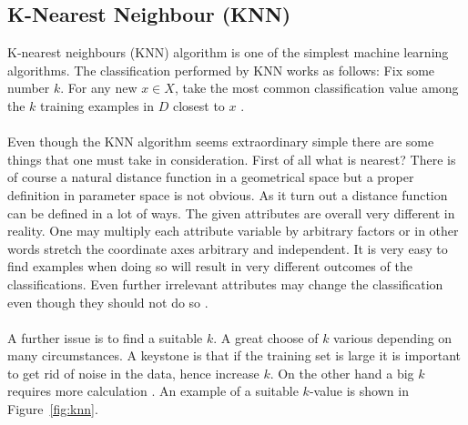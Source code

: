 \subsection{K-Nearest Neighbour (KNN)}
K-nearest neighbours (KNN) algorithm is one of the simplest machine learning
algorithms. The classification performed by KNN works as follows: Fix some
number $k$. For any new $x \in X$, take the most common classification value among
the $k$ training examples in $D$ closest to $x$ \cite{ml_2011}.
\\\\
Even though the KNN algorithm
seems extraordinary simple there are some things that one must take in
consideration. First of all what is nearest? There is of course a natural
distance function in a geometrical space but a proper definition in parameter
space is not obvious. As it turn out a distance function can be defined in a lot
of ways. The given attributes are overall very different in reality.
One may multiply each attribute variable by arbitrary factors or in other
words stretch the coordinate axes arbitrary and independent. It is very easy to
find examples when doing so will result in very different outcomes of the classifications.
Even further irrelevant attributes may change the classification even though they
should not do so \cite{ml_2011}. 
\\\\
A further issue is to find a suitable $k$. A great choose of $k$ various
depending on many circumstances. A keystone is that if the training set is large
it is important to get rid of noise in the data, hence increase $k$. On the other
hand a big $k$ requires more calculation \cite{ml_2011}. An example of a suitable $k$-value 
is shown in Figure~\ref{fig:knn}.\\\\\\\\\\\\
